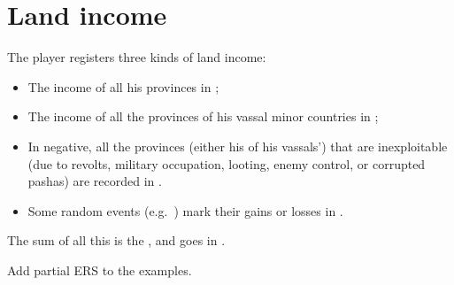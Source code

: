 \section{Land income}\label{chIncomes:LandIncome}
\aparag The player registers three kinds of land income:
\begin{itemize}
\item The income of all his provinces in ;
\item The income of all the provinces of his vassal minor countries in
  ;
\item In negative, all the provinces (either his of his vassals') that
  are inexploitable (due to revolts, military occupation, looting, enemy
  control, or corrupted pashas) are recorded in .
\item Some random events (e.g.~) mark their
gains or losses in .
\end{itemize}
\bparag The sum of all this is the , and goes in
.

\begin{todo}
  Add partial ERS to the examples.
\end{todo}

